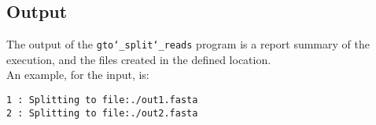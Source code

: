 \subsection*{Output}
The output of the \texttt{gto\char`_split\char`_reads} program is a report summary of the execution, and the files created in the defined location.\\ 
An example, for the input, is:
\begin{lstlisting}
1 : Splitting to file:./out1.fasta
2 : Splitting to file:./out2.fasta
\end{lstlisting}
